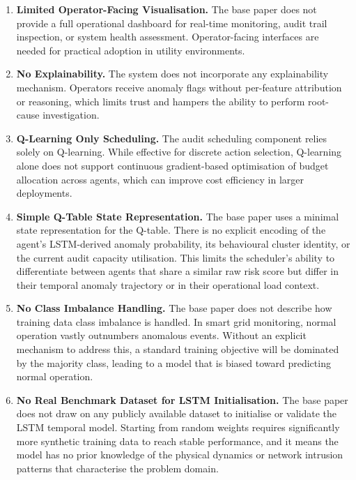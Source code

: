 \begin{enumerate}
    \item \textbf{Limited Operator-Facing Visualisation.} The base paper does not provide a full operational dashboard for real-time monitoring, audit trail inspection, or system health assessment. Operator-facing interfaces are needed for practical adoption in utility environments.

    \item \textbf{No Explainability.} The system does not incorporate any explainability mechanism. Operators receive anomaly flags without per-feature attribution or reasoning, which limits trust and hampers the ability to perform root-cause investigation.

    \item \textbf{Q-Learning Only Scheduling.} The audit scheduling component relies solely on Q-learning. While effective for discrete action selection, Q-learning alone does not support continuous gradient-based optimisation of budget allocation across agents, which can improve cost efficiency in larger deployments.

    \item \textbf{Simple Q-Table State Representation.} The base paper uses a minimal state representation for the Q-table. There is no explicit encoding of the agent's LSTM-derived anomaly probability, its behavioural cluster identity, or the current audit capacity utilisation. This limits the scheduler's ability to differentiate between agents that share a similar raw risk score but differ in their temporal anomaly trajectory or in their operational load context.

    \item \textbf{No Class Imbalance Handling.} The base paper does not describe how training data class imbalance is handled. In smart grid monitoring, normal operation vastly outnumbers anomalous events. Without an explicit mechanism to address this, a standard training objective will be dominated by the majority class, leading to a model that is biased toward predicting normal operation.

    \item \textbf{No Real Benchmark Dataset for LSTM Initialisation.} The base paper does not draw on any publicly available dataset to initialise or validate the LSTM temporal model. Starting from random weights requires significantly more synthetic training data to reach stable performance, and it means the model has no prior knowledge of the physical dynamics or network intrusion patterns that characterise the problem domain.
\end{enumerate}


